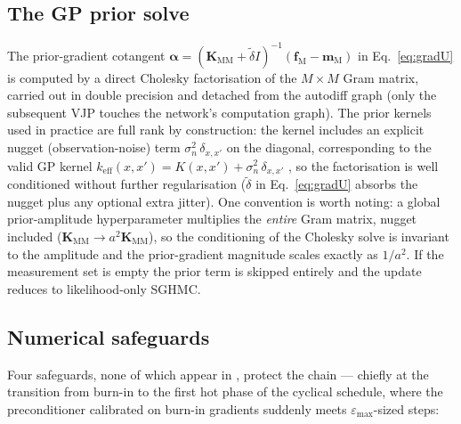 \documentclass[11pt]{article}
\newcommand{\fM}{\mathbf{f}_{\mathrm{M}}}
\newcommand{\mM}{\mathbf{m}_{\mathrm{M}}}
\newcommand{\KMM}{\mathbf{K}_{\mathrm{MM}}}
\begin{document}
\subsection{The GP prior solve}
\label{sec:priorsolve}

The prior-gradient cotangent
$\bm{\alpha} = (\KMM + \tilde\delta I)^{-1}(\fM - \mM)$ in
Eq.~\eqref{eq:gradU} is computed by a direct Cholesky factorisation of the
$M \times M$ Gram matrix, carried out in double precision and detached from
the autodiff graph (only the subsequent VJP touches the network's
computation graph).  The prior kernels used in practice are full rank by
construction: the kernel includes an explicit nugget (observation-noise)
term $\sigma_n^2\,\delta_{x,x'}$ on the diagonal, corresponding to the valid
GP kernel $k_{\mathrm{eff}}(x,x') = K(x,x') + \sigma_n^2\,\delta_{x,x'}$
\cite{rasmussen2006}, so the factorisation is well conditioned without
further regularisation ($\tilde\delta$ in Eq.~\eqref{eq:gradU} absorbs the
nugget plus any optional extra jitter).  One convention is worth noting: a
global prior-amplitude hyperparameter multiplies the \emph{entire} Gram
matrix, nugget included ($\KMM \to a^2 \KMM$), so the conditioning of the
Cholesky solve is invariant to the amplitude and the prior-gradient
magnitude scales exactly as $1/a^{2}$.  If the measurement set is empty the
prior term is skipped entirely and the update reduces to likelihood-only
SGHMC.

\subsection{Numerical safeguards}
\label{sec:safeguards}

Four safeguards, none of which appear in
\cite{wu2025,springenberg2016,zhang2020}, protect the chain --- chiefly at
the transition from burn-in to the first hot phase of the cyclical schedule,
where the preconditioner calibrated on burn-in gradients suddenly meets
$\varepsilon_{\max}$-sized steps:
\end{document}
